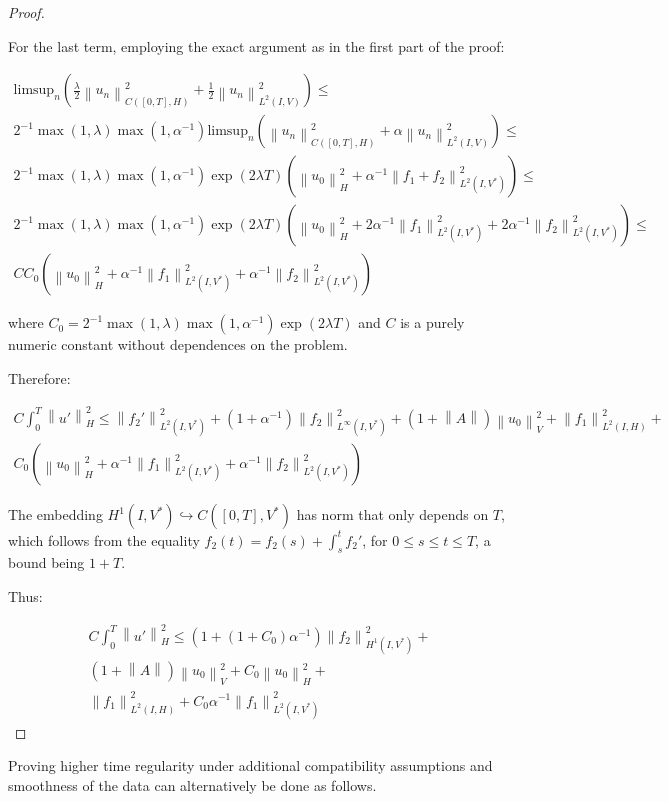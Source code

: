 \documentclass[english,a4paper,9pt,oneside]{scrbook}	%
\theoremstyle{break}
\newenvironment{mproof}[1][\proofname]{%
  \begin{proof}[#1]$ $\par\nobreak\ignorespaces
}{%
  \end{proof}
}
\renewcommand*{\proofname}{Proof}
\theoremstyle{remark}
\newcommand{\ds}{\displaystyle}
\newcommand{\norm}[1]{\left\lVert#1\right\rVert}
\newcommand{\HN}[1]{\norm{#1}_{H}}
\newcommand{\VN}[1]{\norm{#1}_{V}}
\newcommand{\emb}{\hookrightarrow}
\begin{document}
\begin{appendices}
\begin{mproof}
For the last term, employing the exact argument as in the first part of the proof:

\begin{align}
\label{eqn:limsup}
\text{limsup}_n \left ( \frac{\lambda}{2}\norm{u_n}_{C([0,T],H)}^2 + \frac{1}{2}\norm{u_n}_{L^2(I,V)}^2 \right )\leq\\
2^{-1}\max(1,\lambda)\max(1,\alpha^{-1}) \text{limsup}_n \left ( \norm{u_n}_{C([0,T],H)}^2 + {\alpha}\norm{u_n}_{L^2(I,V)}^2 \right )\leq\\
2^{-1}\max(1,\lambda)\max(1,\alpha^{-1})\exp(2\lambda T)(\HN{u_0}^2+\alpha^{-1}\norm{f_1+f_2}^2_{L^2(I,V^*)}) \leq \\
2^{-1}\max(1,\lambda)\max(1,\alpha^{-1})\exp(2\lambda T)(\HN{u_0}^2+2\alpha^{-1}\norm{f_1}^2_{L^2(I,V^*)}+2\alpha^{-1}\norm{f_2}^2_{L^2(I,V^*)}) \leq \\
C C_0(\HN{u_0}^2+\alpha^{-1}\norm{f_1}^2_{L^2(I,V^*)}+\alpha^{-1}\norm{f_2}^2_{L^2(I,V^*)})
\end{align}


where $C_0 = \ds 2^{-1}\max(1,\lambda)\max(1,\alpha^{-1})\exp(2\lambda T)$ and $C$ is a purely numeric constant without dependences on the problem.

Therefore:

\begin{align*}
C\int_0^T\HN{u'}^2\leq 
\norm{f_2'}_{L^2(I,V^*)}^2+(1+\alpha^{-1})\norm{f_2}_{L^\infty(I,V^*)}^2+(1+\norm{A})\VN{u_{0}}^2+\norm{f_1}_{L^2(I,H)}^2+\\
C_0(\HN{u_0}^2+\alpha^{-1}\norm{f_1}^2_{L^2(I,V^*)}+\alpha^{-1}\norm{f_2}^2_{L^2(I,V^*)})
\end{align*}


The embedding $H^1(I,V^*)\emb C([0,T],V^*)$ has norm that only depends on $T$, which follows from the equality $f_2(t)=f_2(s)+\int_s^tf_2'$, for $0\leq s \leq t \leq T$, a bound being $1+T$.

Thus:

\begin{align*}
C\int_0^T\HN{u'}^2\leq 
(1+(1+C_0)\alpha^{-1})\norm{f_2}_{H^1(I,V^*)}^2+\\
(1+\norm{A})\VN{u_{0}}^2+C_0\HN{u_0}^2+\\
\norm{f_1}_{L^2(I,H)}^2+C_0\alpha^{-1}\norm{f_1}^2_{L^2(I,V^*)}
\end{align*}


\end{mproof}


Proving higher time regularity under additional compatibility assumptions and smoothness of the data can alternatively be done as follows.


\end{appendices}
\end{document}
